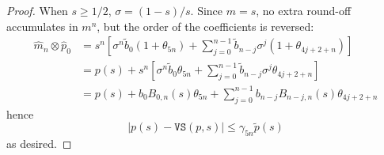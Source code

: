 \documentclass[letterpaper,10pt]{article}
\theoremstyle{definition}
\begin{document}
\begin{proof}
When \(s \geq 1/2\), \(\sigma = (1 - s)/s\). Since \(m = s\), no extra
round-off accumulates in \(m^n\), but the order of the coefficients
is reversed:
\begin{align}
\widehat{m}_n \otimes \widehat{p}_0 &= s^n \left[
  \sigma^n \widetilde{b}_0 (1 + \theta_{5n}) +
  \sum_{j = 0}^{n - 1} \widetilde{b}_{n - j} \sigma^j
  (1 + \theta_{4j + 2 + n})\right] \\
&= p(s) + s^n \left[
  \sigma^n \widetilde{b}_0 \theta_{5n} +
  \sum_{j = 0}^{n - 1} \widetilde{b}_{n - j} \sigma^j
  \theta_{4j + 2 + n}\right] \\
&= p(s) +
  b_0 B_{0, n}(s) \theta_{5n} +
  \sum_{j = 0}^{n - 1} b_{n - j} B_{n - j, n}(s)
  \theta_{4j + 2 + n}
\end{align}
hence
\begin{equation}
\left|p(s) - \mathtt{VS}(p, s)\right| \leq \gamma_{5n}
  \widetilde{p}(s)
\end{equation}
as desired.
\end{proof}
\end{document}
